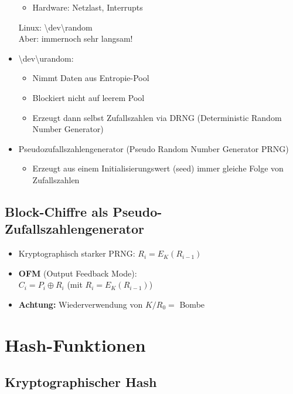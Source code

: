\documentclass[openany]{book}
\begin{document}
\begin{itemize}
\begin{itemize}
        \item Hardware: Netzlast, Interrupts
    \end{itemize} Linux: \textbackslash dev\textbackslash random \\ Aber: immernoch sehr langsam!
    \item \textbackslash dev\textbackslash urandom:
    \begin{itemize}
        \item Nimmt Daten aus Entropie-Pool
        \item Blockiert nicht auf leerem Pool
        \item Erzeugt dann selbst Zufallszahlen via DRNG (Deterministic Random Number Generator)
    \end{itemize}
    \item Pseudozufallszahlengenerator (Pseudo Random Number Generator PRNG)
    \begin{itemize}
        \item Erzeugt aus einem Initialisierungswert (seed) immer gleiche Folge von Zufallszahlen
    \end{itemize}
\end{itemize}

\subsection{Block-Chiffre als Pseudo-Zufallszahlengenerator}

\begin{itemize}
    \item Kryptographisch starker PRNG: $R_i=E_K(R_{i-1})$
    \item \textbf{OFM} (Output Feedback Mode): \\ $C_i=P_i\oplus R_i$ (mit $R_i=E_K(R_{i-1})$)
    \item \textbf{Achtung:} Wiederverwendung von $K/R_0=$ Bombe
\end{itemize}

\newpage

\section{Hash-Funktionen}

\subsection{Kryptographischer Hash}
\end{document}
